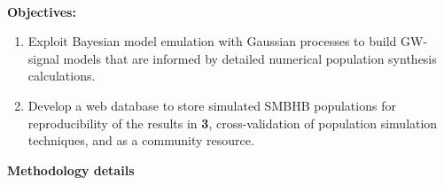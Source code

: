 \documentclass[11pt,letterpaper,sans]{moderncv} %
\begin{document}
\begin{enumerate} [label=\textbf{\Alph*}]
\\\textbf{Objectives:}
\begin{enumerate}[label=\textbf{\arabic*})] 
\setlength\itemsep{0em}
\setcounter{enumii}{2}
\item Exploit Bayesian model emulation with Gaussian processes to build GW-signal models that are informed by detailed numerical population synthesis calculations. 
\item Develop a web database to store simulated SMBHB populations for reproducibility of the results in \textbf{3}, cross-validation of population simulation techniques, and as a community resource. 
\end{enumerate}
\end{enumerate}

\noindent \textbf{Methodology details}
\end{document}
